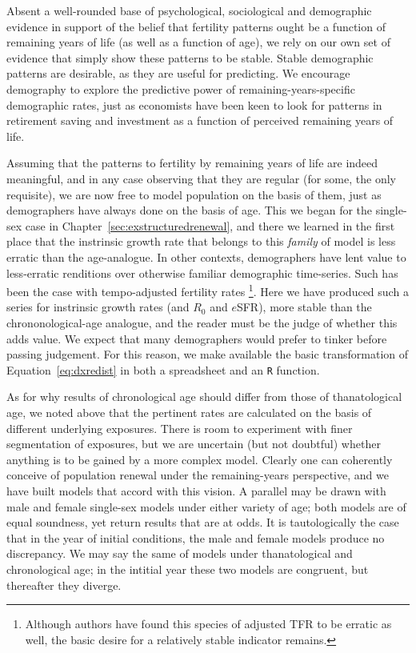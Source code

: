 Absent a well-rounded base of psychological, sociological and demographic
evidence in support of the belief that fertility patterns ought be a function of
remaining years of life (as well as a function of age), we rely on our own
set of evidence that simply show these patterns to be stable. Stable demographic
patterns are desirable, as they are useful for predicting. We encourage
demography to explore the predictive power of remaining-years-specific
demographic rates, just as economists have been keen to look for patterns in
retirement saving and investment as a function of perceived remaining years of
life.

Assuming that the patterns to fertility by remaining years of life
are indeed meaningful, and in any case observing that they are regular (for
some, the only requisite), we are now free to model population on the basis of
them, just as demographers have always done on the basis of age. This we began
for the single-sex case in Chapter~\ref{sec:exstructuredrenewal}, and there we
learned in the first place that the instrinsic growth rate that belongs to this
\textit{family} of model is less erratic than the age-analogue. In other
contexts, demographers have lent value to less-erratic renditions over otherwise
familiar demographic time-series. Such has been the case with tempo-adjusted
fertility rates \citep{bongaarts1998quantum}\footnote{Although authors
\citep[e.g.][]{kim2000quantum} have found this species of adjusted TFR to be
erratic as well, the basic desire for a relatively stable indicator remains.}.
Here we have produced such a series for instrinsic growth rates (and $R_0$ and $e$SFR), 
more stable than the chrononological-age analogue, and the reader must be the 
judge of whether this adds value. We expect that many demographers would prefer
to tinker before passing judgement. For this reason, we make available the 
basic transformation of Equation~\eqref{eq:dxredist} in both a spreadsheet and
an \texttt{R} function.

As for why results of chronological age should differ from those of
thanatological age, we noted above that the pertinent rates are calculated on
the basis of different underlying exposures. There is room to experiment with
 finer segmentation of exposures, but we are uncertain (but not doubtful)
 whether anything is to be gained by a more complex model. Clearly one can
coherently conceive of population renewal under the remaining-years
perspective, and we have built models that accord with this vision. A parallel
may be drawn with male and female single-sex models under either variety of
age; both models are of equal soundness, yet return results that are at odds. 
It is tautologically the case that in the year of initial conditions, the male and
female models produce no discrepancy. We may say the same of models under
thanatological and chronological age; in the intitial year these two models are
congruent, but thereafter they diverge.

